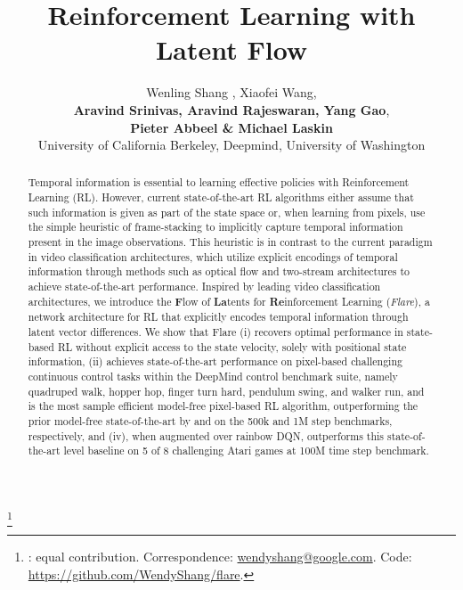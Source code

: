\documentclass{article} \usepackage{iclr2021_conference,times}
\title{Reinforcement Learning with Latent Flow}
\author{Wenling Shang , Xiaofei Wang, \\
\textbf{Aravind Srinivas, Aravind Rajeswaran, Yang Gao}, \\
\textbf{Pieter Abbeel \& Michael Laskin
} \\
University of California Berkeley, Deepmind, University of Washington\\
}
\newcommand\blfootnote[1]{\begingroup
  \renewcommand\thefootnote{}\footnote{#1}\addtocounter{footnote}{-1}\endgroup
}
\begin{document}
\maketitle
\blfootnote{: equal contribution. Correspondence: \href{mailto:wendyshang@google.com}{wendyshang@google.com}. Code: \url{https://github.com/WendyShang/flare}. }
\vspace*{-10pt}

\begin{abstract}

Temporal information is  essential to learning effective policies with Reinforcement Learning (RL). However, current state-of-the-art RL algorithms either assume that such information is given as part of the state space or, when learning from pixels, use the simple heuristic of frame-stacking to implicitly capture temporal information present in the image observations. This heuristic is in contrast to the current paradigm in video classification architectures, which utilize explicit encodings of temporal information through methods such as optical flow and two-stream architectures to achieve state-of-the-art performance. Inspired by leading video classification architectures, we introduce the {\bf F}low of {\bf La}tents for {\bf Re}inforcement Learning (\emph{Flare}), a network architecture for RL that explicitly encodes temporal information through latent vector differences. We show that Flare (i) recovers optimal performance in state-based RL without explicit access to the state velocity, solely with positional state information, (ii) achieves state-of-the-art performance on pixel-based challenging continuous control tasks within the DeepMind control benchmark suite, namely quadruped walk, hopper hop, finger turn hard, pendulum swing, and walker run, and is the most sample efficient model-free pixel-based RL algorithm, outperforming the prior model-free state-of-the-art by  and  on the 500k and 1M step benchmarks, respectively, and (iv), when augmented over rainbow DQN, outperforms this state-of-the-art level baseline on 5 of 8 challenging Atari games at 100M time step benchmark.

\end{abstract}
\end{document}
